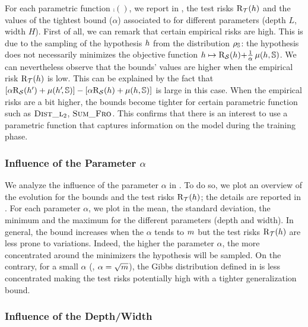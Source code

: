 For each parametric function $\comp()$, we report in , the test risks $\text{R}_{\mathcal{T}}(h)$ and the values of the tightest bound (\wrt $\alpha$) associated to  for different parameters (depth $L$, width $H$).
First of all, we can remark that certain empirical risks are high.
This is due to the sampling of the hypothesis $h$ from the distribution $\rho_{\mathbb{S}}$: the hypothesis does not necessarily minimizes the objective function $h \mapsto \text{R}_{\mathcal{S}}(h){+}\frac{1}{\alpha}\operatorname{\mu}(h, \mathbb{S})$.
We can nevertheless observe that the bounds' values are higher when the empirical risk $\text{R}_{\mathcal{T}}(h)$ is low.
This can be explained by the fact that $\left[\alpha\text{R}_{\mathcal{S}}(h{'})  + \operatorname{\mu}(h'\!,\mathbb{S})\right] - \left[\alpha\text{R}_{\mathcal{S}}(h)+\operatorname{\mu}(h,\mathbb{S})\right]$ is large in this case.
When the empirical risks are a bit higher, the bounds become tighter for certain parametric function such as $\text{\sc Dist\_l$_2$}$, $\text{\sc Sum\_Fro}$. 
This confirms that there is an interest to use a parametric function that captures information on the model during the training phase.

\subsubsection{Influence of the Parameter $\alpha$}
\label{chap:dis-mu:sec:influence-alpha}

We analyze the influence of the parameter $\alpha$ in .
To do so, we plot an overview of the evolution for the bounds and the test risks $\text{R}_{\mathcal{T}}(h)$; the details are reported in . 
For each parameter $\alpha$, we plot in  the mean, the standard deviation, the minimum and the maximum for the different parameters (depth and width).
In general, the bound increases when the $\alpha$ tends to $m$ but the test risks $\text{R}_{\mathcal{T}}(h)$ are less prone to variations.
Indeed, the higher the parameter $\alpha$, the more concentrated around the minimizers the hypothesis will be sampled.
On the contrary, for a small $\alpha$ (\eg, $\alpha=\sqrt{m}$), the Gibbs distribution defined in  is less concentrated making the test risks potentially high with a tighter generalization bound.

\subsubsection{Influence of the Depth/Width}
\label{chap:dis-mu:sec:influence-depth}

